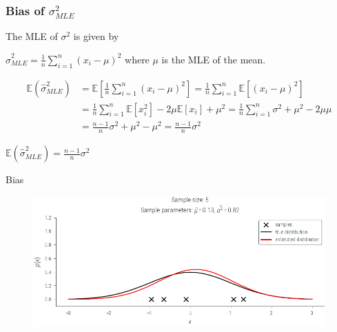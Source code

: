 \documentclass[handout]{beamer}
\begin{document}
    \begin{frame}
        \frametitle{Bias of $\sigma^2_{MLE}$}
        
        The MLE of $\sigma^2$ is given by
        
        $\hat{\sigma}^2_{MLE} = \frac{1}{n} \sum_{i=1}^n (x_i-\mu)^2$ where $\mu$ is the MLE of the mean.
        
        \begin{align*}
            \mathbb{E}(\hat{\sigma}^2_{MLE}) &= \mathbb{E}\left[\frac{1}{n} \sum_{i=1}^n (x_i-\mu)^2\right] = \frac{1}{n} \sum_{i=1}^n \mathbb{E}[(x_i-\mu)^2] \\
            &= \frac{1}{n} \sum_{i=1}^n \mathbb{E}[x_i^2] - 2\mu \mathbb{E}[x_i] + \mu^2 = \frac{1}{n} \sum_{i=1}^n \sigma^2 + \mu^2 - 2\mu \mu \\
            &= \frac{n-1}{n} \sigma^2 + \mu^2 - \mu^2 = \frac{n-1}{n} \sigma^2
            \end{align*}

            \begin{tcolorbox}[colback=metropolisblue!5,colframe=metropolisblue,title= Estimator $\hat{\sigma}^2_{MLE}$ is biased]
                $\mathbb{E}(\hat{\sigma}^2_{MLE}) = \frac{n-1}{n} \sigma^2$
            \end{tcolorbox}

        \end{frame}

        \begin{frame}{Bias }
            \begin{figure}
                \includegraphics{../figures/mle/biased-mle-normal-5-0.pdf}
            \end{figure}
            
        \end{frame}
\end{document}
